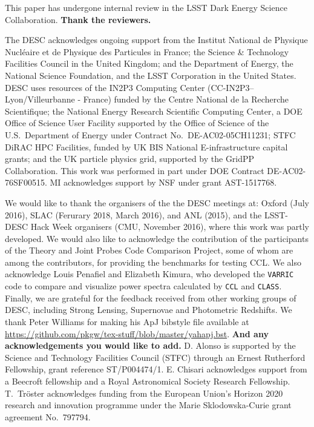 %
This paper has undergone internal review in the LSST Dark Energy Science Collaboration. {\bf Thank the reviewers.}

The DESC acknowledges ongoing support from the Institut National de Physique Nucl\'eaire et de Physique des Particules in France; the Science \& Technology Facilities Council in the United Kingdom; and the Department of Energy, the National Science Foundation, and the LSST Corporation in the United States.  DESC uses resources of the IN2P3 Computing Center (CC-IN2P3--Lyon/Villeurbanne - France) funded by the Centre National de la Recherche Scientifique; the National Energy Research Scientific Computing Center, a DOE Office of Science User Facility supported by the Office of Science of the U.S.\ Department of Energy under Contract No.\ DE-AC02-05CH11231; STFC DiRAC HPC Facilities, funded by UK BIS National E-infrastructure capital grants; and the UK particle physics grid, supported by the GridPP Collaboration.  This work was performed in part under DOE Contract DE-AC02-76SF00515. MI acknowledges support by NSF under grant AST-1517768.

We would like to thank the organisers of the the DESC meetings at: Oxford (July 2016), SLAC (Ferurary 2018, March 2016), and ANL (2015), and the LSST-DESC Hack Week organisers (CMU, November 2016), where this work 
was partly developed. We would also like to acknowledge the contribution of the participants of the Theory and Joint Probes Code Comparison Project, some of whom are among the \ccl contributors, for providing the benchmarks for testing CCL. We also acknowledge Louis Penafiel and Elizabeth Kimura, who developed the {\tt VARRIC} code to compare and visualize power spectra calculated by {\tt CCL} and {\tt CLASS}. Finally, we are grateful for the feedback received from other working groups of DESC, including Strong Lensing, Supernovae and Photometric Redshifts.
We thank Peter Williams for making his ApJ bibstyle file available at \url{https://github.com/pkgw/tex-stuff/blob/master/yahapj.bst}.
%
{\bf And any acknowledgements you would like to add.}
D. Alonso is supported by the Science and Technology Facilities Council (STFC) through an Ernest Rutherford Fellowship, grant reference ST/P004474/1.
E. Chisari acknowledges support from a Beecroft fellowship and a Royal Astronomical Society Research Fellowship. 
T.~Tr\"oster acknowledges funding from the European Union's Horizon 2020 research and innovation programme under the Marie Sk{l}odowska-Curie grant agreement No.\ 797794.

